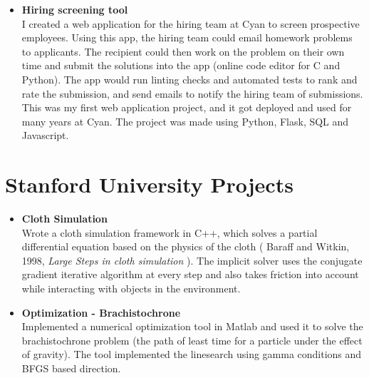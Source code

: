 \documentclass[line, 11pt]{res}
\renewenvironment{resume}{\begingroup}{\endgroup}
\begin{document}
\begin{resume}
\begin{itemize}
        \item \textbf{Hiring screening tool}\\
    I created a web application for the hiring team at Cyan to screen prospective employees. Using this app, the hiring team could email homework problems to applicants. The recipient could then work on the problem on their own time and submit the solutions into the app (online code editor for C and Python). The app would run linting checks and automated tests to rank and rate the submission, and send emails to notify the hiring team of submissions. This was my first web application project, and it got deployed and used for many years at Cyan. The project was made using Python, Flask, SQL and Javascript.

    \end{itemize}

\vspace{-10pt}
\section{Stanford University Projects}
    \begin{itemize}
        \item \textbf{Cloth Simulation}\\
        Wrote a cloth simulation framework in C++, which solves a partial
        differential equation based on the physics of the cloth ( Baraff and
        Witkin, 1998, \emph{Large Steps in cloth simulation} ).
        The implicit solver uses the conjugate gradient iterative algorithm
        at every step and also takes friction into account while interacting
        with objects in the environment.

        \item \textbf{Optimization - Brachistochrone}\\
        Implemented a numerical optimization tool in Matlab and used it to
        solve the brachistochrone problem (the path of least time for a
        particle under the effect of gravity). The tool implemented the
        linesearch using gamma conditions and BFGS based direction.

    \end{itemize}

\vspace{-10pt}

\end{resume}
\end{document}
